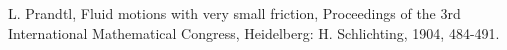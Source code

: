 
\begin{thebibliography}{9}%


 L. Prandtl, Fluid motions with very small friction, Proceedings of the 3rd International Mathematical Congress, Heidelberg: H. Schlichting, 1904, 484-491.

\end{thebibliography}

